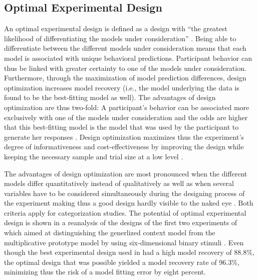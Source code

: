 \documentclass[a4paper,man,natbib]{apa6}
\begin{document}
\subsection{Optimal Experimental Design}
An optimal experimental design is defined as a design with ``the greatest likelihood of differentiating the models under consideration'' \cite[][p. 500]{myung2009optimal}. Being able to differentiate between the different models under consideration means that each model is associated with unique behavioral predictions. Participant behavior can thus be linked with greater certainty to one of the models under consideration. Furthermore, through the maximization of model prediction differences, design optimization increases model recovery (i.e., the model underlying the data is found to be the best-fitting model as well). The advantages of design optimization are thus two-fold: A participant's behavior can be associated more exclusively with one of the models under consideration and the odds are higher that this best-fitting model is the model that was used by the participant to generate her responses \citep[albeit that each scientific model is only an approximation of the participant's cognitive model; see][]{myung2009optimal}. Design optimization maximizes thus the experiment's degree of informativeness and cost-effectiveness by improving the design while keeping the necessary sample and trial size at a low level \citep{cavagnaro2009better, ouyang2016practical, raffert2012optimally, atkinson2007optimum, nelson2005finding}. 

The advantages of design optimization are most pronounced when the different models differ quantitatively instead of qualitatively as well as when several variables have to be considered simultaneously during the designing process of the experiment making thus a good design hardly visible to the naked eye \citep{myung2009optimal}. Both criteria apply for categorization studies.
The potential of optimal experimental design is shown in a reanalysis of the designs of the first two experiments of \cite{smith1998prototypes} which aimed at distinguishing the generlized context model \citep{nosofsky1986attention} from the multiplicative prototype model \citep{smith1998prototypes} by using six-dimensional binary stimuli \citep{myung2009optimal}. Even though the best experimental design used in \cite{smith1998prototypes} had a high model recovery of 88.8\%, the optimal design that was possible yielded a model recovery rate of 96.3\%, minimizing thus the risk of a model fitting error by eight percent.  
\end{document}
